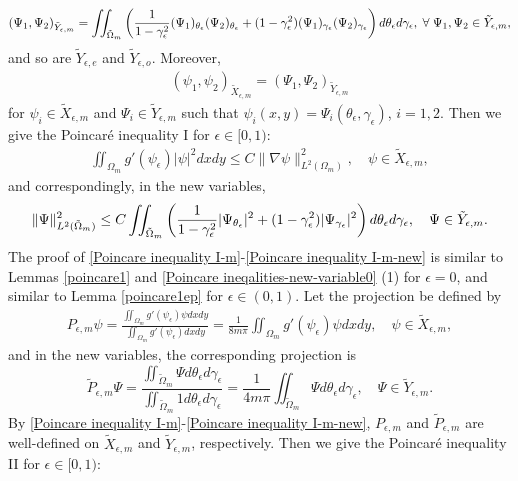 \documentclass[1 [leqno, 11pt]{amsart}
\numberwithin{equation}{section}
\let\ep=\epsilon
\def\gep{\gamma_\epsilon}
\begin{document}
\begin{CJK*}{GBK}{song}
 $$(\Psi_1, \Psi_2)_{\tilde{Y}_{\ep,m}} = \iint_{\tilde{\Omega}_{m}}  \left({1\over1-\gamma_\ep^2}(\Psi_1)_{\theta_\ep}(\Psi_2)_{\theta_\ep} +(1-\gamma_\ep^2)(\Psi_1)_{\gamma_\ep}(\Psi_2)_{\gamma_\ep}\right)d \theta_\ep d\gamma_\ep, \; \forall\; \Psi_1, \Psi_2 \in \tilde{Y}_{\ep,m},$$
and so are $\tilde{Y}_{\ep, e}$ and  $\tilde{Y}_{\ep, o}$.
Moreover,
\begin{align*}
(\psi_1, \psi_2)_{\tilde{X}_{\ep,m}}=(\Psi_1, \Psi_2)_{\tilde{Y}_{\ep,m}}
\end{align*}
for   $\psi_i \in \tilde{X}_{\ep,m}$ and $\Psi_i \in \tilde{Y}_{\ep,m}$ such that $\psi_i(x,y) = \Psi_i(\theta_\ep, \gamma_\ep)$, $i=1,2$.
Then we give the Poincar\'e inequality I for $\ep\in[0,1)$:
\begin{align}\label{Poincare inequality I-m}
\iint_{\Omega_m} g'(\psi_\epsilon)|\psi|^2 dxdy  \leq C \|\nabla \psi\|_{L^2(\Omega_m)}^2,\quad \psi \in \tilde{X}_{\ep,m},
\end{align}
and correspondingly, in the new variables,
\begin{align}\label{Poincare inequality I-m-new}
 \|\Psi\|_{L^2(\tilde \Omega_{m})}^2  \leq C \iint_{\tilde \Omega_m}\left({1\over1-\gamma_\ep^2}|\Psi_{\theta_\ep}|^2+(1-\gamma_\ep^2)|\Psi_{\gamma_\ep}|^2\right)d \theta_\ep d\gamma_\ep,\quad \Psi \in \tilde{Y}_{\ep,m}.
\end{align}
The proof of \eqref{Poincare inequality I-m}-\eqref{Poincare inequality I-m-new} is similar to Lemmas \ref{poincare1} and \ref{Poincare ineqalities-new-variable0} (1) for $\ep=0$, and similar to Lemma \ref{poincare1ep} for $\ep\in(0,1)$.
Let the projection be defined by
\begin{align}\label{def-projection-multi periodic}
P_{\ep,m} \psi = \frac{\iint_{\Omega_m}g'(\psi_\ep) \psi dxdy}{\iint_{\Omega_m}g'(\psi_\ep) dxdy} = \frac{1}{8m\pi}\iint_{\Omega_m}g'(\psi_\ep) \psi dxdy,\quad\psi\in \tilde X_{\ep,m},
\end{align}
and in the new variables, the corresponding projection is
$$\tilde{P}_{\ep,m} \Psi = \frac{\iint_{\tilde{\Omega}_{m}} \Psi d\theta_\ep d\gep}{\iint_{\tilde{\Omega}_{m}}1 d\theta_\ep d\gep} = \frac{1}{4m\pi}\iint_{\tilde{\Omega}_{m}}\Psi d\theta_\ep d\gep,\quad\Psi\in\tilde Y_{\ep,m}.$$
By \eqref{Poincare inequality I-m}-\eqref{Poincare inequality I-m-new}, $P_{\ep,m}$ and $\tilde{P}_{\ep,m}$ are well-defined on $\tilde X_{\ep,m}$ and $\tilde Y_{\ep,m}$, respectively. Then we give the
Poincar\'e inequality II for $\ep\in[0,1)$:
\begin{align}\label{Poincare inequality II-m}

\end{align}
\end{CJK*}
\end{document}
